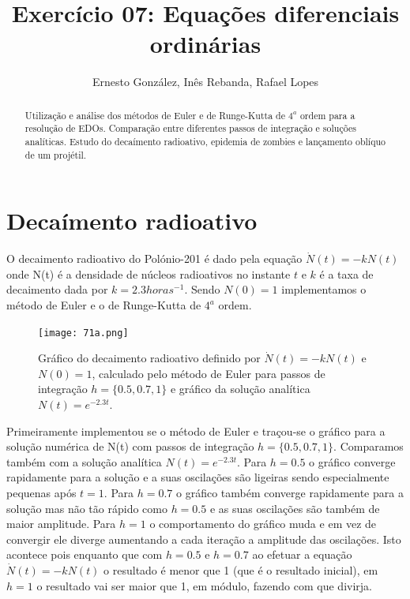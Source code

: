 \documentclass[aps,pre,twocolumn,showpacs,amsmath,amssymb]{revtex4-1}
\begin{document}
\title{Exercício 07: Equações diferenciais ordinárias}

\author{Ernesto González, Inês Rebanda, Rafael Lopes}

\begin{abstract}
  Utilização e análise dos métodos de Euler e de Runge-Kutta de $4^{a}$ ordem para a resolução de EDOs. Comparação entre diferentes passos de integração e soluções analíticas. Estudo do decaímento radioativo, epidemia de zombies e lançamento oblíquo de um projétil.
\end{abstract}

\maketitle

\section{Decaímento radioativo}
O decaimento radioativo do Polónio-201 é dado pela equação $\dot{N}(t)=-kN(t)$ onde N(t) é a densidade de núcleos radioativos no instante $t$ e $k$ é a taxa de decaimento dada por $k=2.3 horas^{-1}$. Sendo $N(0)=1$ implementamos o método de Euler e o de Runge-Kutta de $4^{a}$ ordem.

\begin{figure}[h]
   \begin{center}
    \texttt{[image: 71a.png]} \\
\caption{Gráfico do decaimento radioativo definido por $\dot{N}(t)=-kN(t)$ e $N(0)=1$, calculado pelo método de Euler para passos de integração $h=\{0.5,0.7,1\}$ e gráfico da solução analítica $N(t)=e^{-2.3t}$.}
  \label{fig.exemplo}
   \end{center}
  \end{figure}

Primeiramente implementou se o método de Euler e traçou-se o gráfico para a solução numérica de N(t) com passos de integração $h=\{0.5, 0.7, 1\}$. Comparamos também com a solução analítica $N(t)=e^{-2.3t}$.
Para $h=0.5$ o gráfico converge rapidamente para a solução e a suas oscilações são ligeiras sendo especialmente pequenas após $t=1$.
Para $h=0.7$ o gráfico também converge rapidamente para a solução mas não tão rápido como $h=0.5$ e as suas oscilações são também de maior amplitude.
Para $h=1$ o comportamento do gráfico muda e em vez de convergir ele diverge aumentando a cada iteração a amplitude das oscilações. Isto acontece pois enquanto que com $h=0.5$ e $h=0.7$ ao efetuar a equação $\dot{N}(t)=-kN(t)$ o resultado é menor que 1 (que é o resultado inicial), em $h=1$ o resultado vai ser maior que 1, em módulo, fazendo com que divirja. \\
\end{document}
